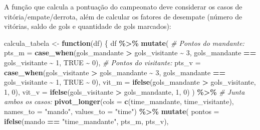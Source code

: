 \documentclass[11pt,]{article}
\newenvironment{Shaded}{\begin{snugshade}}{\end{snugshade}}
\newcommand{\AttributeTok}[1]{\textcolor[rgb]{0.13,0.29,0.53}{#1}}
\newcommand{\CommentTok}[1]{\textcolor[rgb]{0.56,0.35,0.01}{\textit{#1}}}
\newcommand{\ConstantTok}[1]{\textcolor[rgb]{0.56,0.35,0.01}{#1}}
\newcommand{\ControlFlowTok}[1]{\textcolor[rgb]{0.13,0.29,0.53}{\textbf{#1}}}
\newcommand{\DecValTok}[1]{\textcolor[rgb]{0.00,0.00,0.81}{#1}}
\newcommand{\FunctionTok}[1]{\textcolor[rgb]{0.13,0.29,0.53}{\textbf{#1}}}
\newcommand{\NormalTok}[1]{#1}
\newcommand{\OtherTok}[1]{\textcolor[rgb]{0.56,0.35,0.01}{#1}}
\newcommand{\SpecialCharTok}[1]{\textcolor[rgb]{0.81,0.36,0.00}{\textbf{#1}}}
\newcommand{\StringTok}[1]{\textcolor[rgb]{0.31,0.60,0.02}{#1}}
\begin{document}
A função que calcula a pontuação do campeonato deve considerar os casos
de vitória/empate/derrota, além de calcular os fatores de desempate
(número de vitórias, saldo de gols e quantidade de gols marcados):

\begin{Shaded}
\begin{Highlighting}[]
\NormalTok{calcula\_tabela }\OtherTok{\textless{}{-}} \ControlFlowTok{function}\NormalTok{(df) \{}
\NormalTok{    df }\SpecialCharTok{\%\textgreater{}\%}
        \FunctionTok{mutate}\NormalTok{(}
            \CommentTok{\# Pontos do mandante:}
            \AttributeTok{pts\_m =} \FunctionTok{case\_when}\NormalTok{(gols\_mandante }\SpecialCharTok{\textgreater{}}\NormalTok{ gols\_visitante }\SpecialCharTok{\textasciitilde{}} \DecValTok{3}\NormalTok{,}
\NormalTok{                              gols\_mandante }\SpecialCharTok{==}\NormalTok{ gols\_visitante }\SpecialCharTok{\textasciitilde{}} \DecValTok{1}\NormalTok{,}
                              \ConstantTok{TRUE} \SpecialCharTok{\textasciitilde{}} \DecValTok{0}\NormalTok{),}
            \CommentTok{\# Pontos do visitante:}
            \AttributeTok{pts\_v =} \FunctionTok{case\_when}\NormalTok{(gols\_visitante }\SpecialCharTok{\textgreater{}}\NormalTok{ gols\_mandante }\SpecialCharTok{\textasciitilde{}} \DecValTok{3}\NormalTok{,}
\NormalTok{                              gols\_mandante }\SpecialCharTok{==}\NormalTok{ gols\_visitante }\SpecialCharTok{\textasciitilde{}} \DecValTok{1}\NormalTok{,}
                              \ConstantTok{TRUE} \SpecialCharTok{\textasciitilde{}} \DecValTok{0}\NormalTok{),}
            \AttributeTok{vit\_m =} \FunctionTok{ifelse}\NormalTok{(gols\_mandante }\SpecialCharTok{\textgreater{}}\NormalTok{ gols\_visitante, }\DecValTok{1}\NormalTok{, }\DecValTok{0}\NormalTok{),}
            \AttributeTok{vit\_v =} \FunctionTok{ifelse}\NormalTok{(gols\_visitante }\SpecialCharTok{\textgreater{}}\NormalTok{ gols\_mandante, }\DecValTok{1}\NormalTok{, }\DecValTok{0}\NormalTok{)}
\NormalTok{        ) }\SpecialCharTok{\%\textgreater{}\%}
        \CommentTok{\# Junta ambos os casos:}
        \FunctionTok{pivot\_longer}\NormalTok{(}\AttributeTok{cols =} \FunctionTok{c}\NormalTok{(time\_mandante, time\_visitante),}
                     \AttributeTok{names\_to =} \StringTok{"mando"}\NormalTok{, }\AttributeTok{values\_to =} \StringTok{"time"}\NormalTok{) }\SpecialCharTok{\%\textgreater{}\%}
        \FunctionTok{mutate}\NormalTok{(}
            \AttributeTok{pontos =} \FunctionTok{ifelse}\NormalTok{(mando }\SpecialCharTok{==} \StringTok{"time\_mandante"}\NormalTok{, pts\_m, pts\_v),}

\end{Highlighting}
\end{Shaded}
\end{document}
